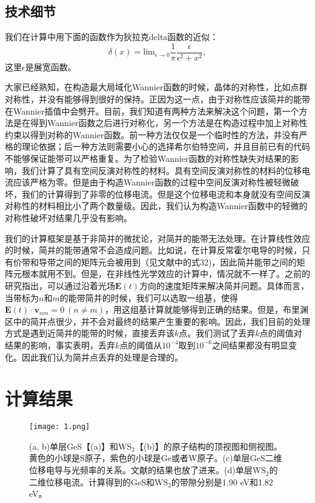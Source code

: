 \subsection{技术细节}

我们在计算中用下面的函数作为狄拉克delta函数的近似：
\[
\delta(x) = \text{lim}_{\epsilon\to0}\frac{1}{\pi}\frac{\epsilon}{\epsilon^{2}+x^{2}},
\]
这里$\epsilon$是展宽函数。

大家已经熟知，在构造最大局域化Wannier函数的时候，晶体的对称性，比如点群对称性，并没有能够得到很好的保持。正因为这一点，由于对称性应该简并的能带在Wannier插值中会劈开。目前，我们知道有两种方法来解决这个问题，第一个方法是在得到Wannier函数之后进行对称化，另一个方法是在构造过程中加上对称性约束以得到对称的Wannier函数。前一种方法仅仅是一个临时性的方法，并没有严格的理论依据；后一种方法则需要小心的选择希尔伯特空间，并且目前已有的代码不能够保证能带可以严格重复。为了检验Wannier函数的对称性缺失对结果的影响，我们计算了具有空间反演对称性的材料。具有空间反演对称性的材料的位移电流应该严格为零。但是由于构造Wannier函数的过程中空间反演对称性被轻微破坏，我们的计算得到了非零的位移电流。但是这个位移电流和本身就没有空间反演对称性的材料相比小了两个数量级。因此，我们认为构造Wannier函数中的轻微的对称性破坏对结果几乎没有影响。

我们的计算框架是基于非简并的微扰论，对简并的能带无法处理。在计算线性效应的时候，简并的能带通常不会造成问题。比如说，在计算反常霍尔电导的时候，只有价带和导带之间的矩阵元会被用到（见文献中的式32)，因此简并能带之间的矩阵元根本就用不到。但是，在非线性光学效应的计算中，情况就不一样了。之前的研究指出，可以通过沿着光场$\mathbf{E}(t)$方向的速度矩阵来解决简并问题。具体而言，当带标为$n$和$m$的能带简并的时候，我们可以选取一组基，使得$\mathbf{E}(t)\cdot\mathbf{v}_{nm}=0  \ (n\ne m)$\cite{sipe_second-order_2000}，用这组基计算就能够得到正确的结果。但是，布里渊区中的简并点很少，并不会对最终的结果产生重要的影响。因此，我们目前的处理方式是遇到近简并的能带的时候，直接丢弃该$k$点。我们测试了丢弃$k$点的阈值对结果的影响，事实表明，丢弃$k$点的阈值从$10^{-4}$取到$10^{-6}$之间结果都没有明显变化。因此我们认为简并点丢弃的处理是合理的。

\section{计算结果}


\begin{figure}
	\begin{centering}
	\texttt{[image: 1.png]}
	\par\end{centering}
	\caption{\label{fig1} (a, b)单层GeS【(a)】和WS$_{2}$【(b)】的原子结构的顶视图和侧视图。黄色的小球是S原子，紫色的小球是Ge或者W原子。(c)单层GeS二维位移电导与光频率的关系。文献的结果也放了进来。(d)单层WS$_2$的二维位移电流。计算得到的GeS和WS$_2$的带隙分别是1.90 eV和1.82 eV。}
\end{figure}

